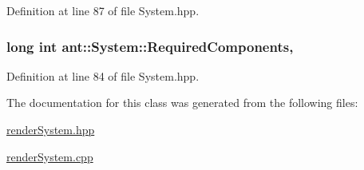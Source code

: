 Definition at line 87 of file System.\+hpp.

\hypertarget{classant_1_1_system_a4ef41cfc496e41ac6730f90629524ec7}{
\subsubsection[{Required\+Components}]{\setlength{\rightskip}{0pt plus 5cm}long int ant\+::\+System\+::\+Required\+Components\hspace{0.3cm}{\ttfamily [protected]}, {\ttfamily [inherited]}}}\label{classant_1_1_system_a4ef41cfc496e41ac6730f90629524ec7}


Definition at line 84 of file System.\+hpp.



The documentation for this class was generated from the following files\+:\begin{DoxyCompactItemize}
\item 
\hyperlink{render_system_8hpp}{render\+System.\+hpp}\item 
\hyperlink{render_system_8cpp}{render\+System.\+cpp}\end{DoxyCompactItemize}
